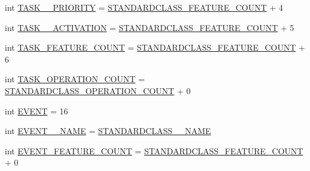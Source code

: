 \begin{DoxyCompactItemize}
int \hyperlink{interfaceshootingmachineemfmodel_1_1_shootingmachineemfmodel_package_a503bb84ed071da23eaa6ddf93697203e}{T\-A\-S\-K\-\_\-\-\_\-\-P\-R\-I\-O\-R\-I\-T\-Y} = \hyperlink{interfaceshootingmachineemfmodel_1_1_shootingmachineemfmodel_package_a14037f66989b3107e402142df96ee9aa}{S\-T\-A\-N\-D\-A\-R\-D\-C\-L\-A\-S\-S\-\_\-\-F\-E\-A\-T\-U\-R\-E\-\_\-\-C\-O\-U\-N\-T} + 4
\item 
int \hyperlink{interfaceshootingmachineemfmodel_1_1_shootingmachineemfmodel_package_acaa0d423bb2cc890173d67409494bd3d}{T\-A\-S\-K\-\_\-\-\_\-\-A\-C\-T\-I\-V\-A\-T\-I\-O\-N} = \hyperlink{interfaceshootingmachineemfmodel_1_1_shootingmachineemfmodel_package_a14037f66989b3107e402142df96ee9aa}{S\-T\-A\-N\-D\-A\-R\-D\-C\-L\-A\-S\-S\-\_\-\-F\-E\-A\-T\-U\-R\-E\-\_\-\-C\-O\-U\-N\-T} + 5
\item 
int \hyperlink{interfaceshootingmachineemfmodel_1_1_shootingmachineemfmodel_package_a7938b93e2769090ce3b4ef54dfb6345d}{T\-A\-S\-K\-\_\-\-F\-E\-A\-T\-U\-R\-E\-\_\-\-C\-O\-U\-N\-T} = \hyperlink{interfaceshootingmachineemfmodel_1_1_shootingmachineemfmodel_package_a14037f66989b3107e402142df96ee9aa}{S\-T\-A\-N\-D\-A\-R\-D\-C\-L\-A\-S\-S\-\_\-\-F\-E\-A\-T\-U\-R\-E\-\_\-\-C\-O\-U\-N\-T} + 6
\item 
int \hyperlink{interfaceshootingmachineemfmodel_1_1_shootingmachineemfmodel_package_a9b8a8820092643928f0c1ebab194f957}{T\-A\-S\-K\-\_\-\-O\-P\-E\-R\-A\-T\-I\-O\-N\-\_\-\-C\-O\-U\-N\-T} = \hyperlink{interfaceshootingmachineemfmodel_1_1_shootingmachineemfmodel_package_a2fe5d848cfe0a02fe5609e2c5ed7e7c7}{S\-T\-A\-N\-D\-A\-R\-D\-C\-L\-A\-S\-S\-\_\-\-O\-P\-E\-R\-A\-T\-I\-O\-N\-\_\-\-C\-O\-U\-N\-T} + 0
\item 
int \hyperlink{interfaceshootingmachineemfmodel_1_1_shootingmachineemfmodel_package_a17975c136ffb7a00885baefd2d0a6f3c}{E\-V\-E\-N\-T} = 16
\item 
int \hyperlink{interfaceshootingmachineemfmodel_1_1_shootingmachineemfmodel_package_adfb3c7d591083a0612fbcc21fc2b44fa}{E\-V\-E\-N\-T\-\_\-\-\_\-\-N\-A\-M\-E} = \hyperlink{interfaceshootingmachineemfmodel_1_1_shootingmachineemfmodel_package_a06475d7d54d52ee19b2aaf4d5d73c738}{S\-T\-A\-N\-D\-A\-R\-D\-C\-L\-A\-S\-S\-\_\-\-\_\-\-N\-A\-M\-E}
\item 
int \hyperlink{interfaceshootingmachineemfmodel_1_1_shootingmachineemfmodel_package_a3d4f3c28358c982d394cd32df420a857}{E\-V\-E\-N\-T\-\_\-\-F\-E\-A\-T\-U\-R\-E\-\_\-\-C\-O\-U\-N\-T} = \hyperlink{interfaceshootingmachineemfmodel_1_1_shootingmachineemfmodel_package_a14037f66989b3107e402142df96ee9aa}{S\-T\-A\-N\-D\-A\-R\-D\-C\-L\-A\-S\-S\-\_\-\-F\-E\-A\-T\-U\-R\-E\-\_\-\-C\-O\-U\-N\-T} + 0

\end{DoxyCompactItemize}
